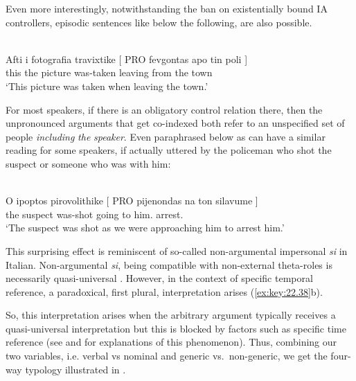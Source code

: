 \documentclass[output=paper]{langsci/langscibook}
\begin{document}
Even more interestingly, notwithstanding the ban on existentially bound IA
controllers, episodic sentences like  below the following, are
also possible.

\ea%
    \label{ex:key:22.36} \\
    \gll    Afti  i   fotografia travixtike [ PRO fevgontas apo    tin  poli ] \\
            this the     picture      was-taken {} {}    leaving     from  the town\\
    \glt    \enquote*{This picture was taken when leaving the town.}
\z

For most speakers, if there is an obligatory control relation there, then the
unpronounced arguments that get co-indexed both refer to an unspecified set of
people \emph{including} \emph{the} \emph{speaker}.   Even 
paraphrased below as  can have a similar reading for some
speakers, if actually uttered by the policeman who shot the suspect or someone
who was with him:

\ea%
\label{ex:key:22.37}\\
    \gll    \llap{\%}O    ipoptos   pirovolithike   [ PRO pijenondas   na   ton silavume ]\\
            the suspect  was-shot {} {}      going    to  him.\Cl{} arrest.\Fpl{}\\
    \glt    \enquote*{The suspect was shot as we were approaching him to arrest him.}
\z

This surprising effect is reminiscent of so-called non-argumental impersonal
\emph{si} in Italian. Non-argumental \emph{si}, being compatible with
non-external theta-roles is necessarily quasi-universal \citep{Cinque:1988}.
However, in the context of specific temporal reference, a paradoxical,
first plural, interpretation arises (\ref{ex:key:22.38}b).

\ea%
    \label{ex:key:22.38}
    \z
\z

So, this \Fpl{} interpretation arises when the arbitrary argument typically
receives a quasi-universal interpretation but this is blocked by factors such
as specific time reference (see \citealt{Cinque:1988} and \citealt{Roberts2014b}
for explanations of this phenomenon). Thus, combining our two variables, i.e.
verbal vs nominal  and generic vs.\ non-generic, we get the four-way
typology illustrated in .
\end{document}
